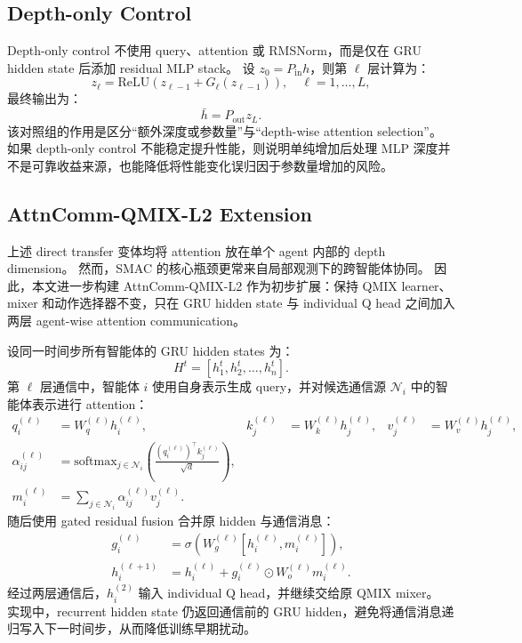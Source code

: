 \subsection{Depth-only Control}

Depth-only control 不使用 query、attention 或 RMSNorm，而是仅在 GRU hidden state 后添加 residual MLP stack。
设 \(z_0=P_{\mathrm{in}}h\)，则第 \(\ell\) 层计算为：
\begin{equation}
  z_\ell =
  \mathrm{ReLU}
  \left(
    z_{\ell-1}+G_\ell(z_{\ell-1})
  \right),
  \quad \ell=1,\ldots,L,
\end{equation}
最终输出为：
\begin{equation}
  \bar{h}=P_{\mathrm{out}}z_L.
\end{equation}
该对照组的作用是区分“额外深度或参数量”与“depth-wise attention selection”。
如果 depth-only control 不能稳定提升性能，则说明单纯增加后处理 MLP 深度并不是可靠收益来源，也能降低将性能变化误归因于参数量增加的风险。

\subsection{AttnComm-QMIX-L2 Extension}

上述 direct transfer 变体均将 attention 放在单个 agent 内部的 depth dimension。
然而，SMAC 的核心瓶颈更常来自局部观测下的跨智能体协同。
因此，本文进一步构建 AttnComm-QMIX-L2 作为初步扩展：保持 QMIX learner、mixer 和动作选择器不变，只在 GRU hidden state 与 individual Q head 之间加入两层 agent-wise attention communication。

设同一时间步所有智能体的 GRU hidden states 为：
\begin{equation}
  H^t=[h_1^t,h_2^t,\ldots,h_n^t].
\end{equation}
第 \(\ell\) 层通信中，智能体 \(i\) 使用自身表示生成 query，并对候选通信源 \(\mathcal{N}_i\) 中的智能体表示进行 attention：
\begin{align}
  q_i^{(\ell)} &= W_q^{(\ell)}h_i^{(\ell)}, &
  k_j^{(\ell)} &= W_k^{(\ell)}h_j^{(\ell)}, &
  v_j^{(\ell)} &= W_v^{(\ell)}h_j^{(\ell)}, \\
  \alpha_{ij}^{(\ell)}
  &=
  \mathrm{softmax}_{j\in\mathcal{N}_i}
  \left(
    \frac{(q_i^{(\ell)})^\top k_j^{(\ell)}}{\sqrt{d}}
  \right), \\
  m_i^{(\ell)}
  &=
  \sum_{j\in\mathcal{N}_i}\alpha_{ij}^{(\ell)}v_j^{(\ell)} .
\end{align}
随后使用 gated residual fusion 合并原 hidden 与通信消息：
\begin{align}
  g_i^{(\ell)}
  &=
  \sigma\left(W_g^{(\ell)}[h_i^{(\ell)},m_i^{(\ell)}]\right), \\
  h_i^{(\ell+1)}
  &=
  h_i^{(\ell)}+
  g_i^{(\ell)}\odot W_o^{(\ell)}m_i^{(\ell)} .
\end{align}
经过两层通信后，\(h_i^{(2)}\) 输入 individual Q head，并继续交给原 QMIX mixer。
实现中，recurrent hidden state 仍返回通信前的 GRU hidden，避免将通信消息递归写入下一时间步，从而降低训练早期扰动。

